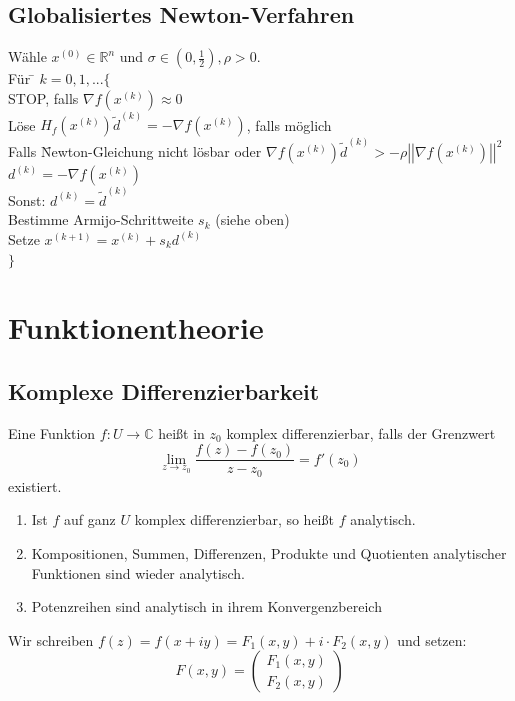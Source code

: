 \documentclass[4pt,a4paper]{scrartcl}
\begin{document}
\begin{multicols}{4}
\subsection{Globalisiertes Newton-Verfahren}
\begin{tabbing}
Wähle $x^{(0)}\in\mathbb{R}^n$ und $\sigma\in\left(0,\frac{1}{2}\right),\rho>0$.\\
Für \= $k=0,1,...\{$\\
\> STOP, falls $\nabla f\left(x^{(k)}\right)\approx 0$\\
\> Löse $H_f\left(x^{(k)}\right)\tilde{d}^{(k)}=-\nabla f\left(x^{(k)}\right)$, falls möglich\\
\>Falls \=Newton-Gleichung nicht lösbar oder $\nabla f\left(x^{(k)}\right)\tilde{d}^{(k)}>-\rho \left|\left|\nabla f\left(x^{(k)}\right)\right|\right|^2$\\
\>\> $d^{(k)}=-\nabla f\left(x^{(k)}\right)$\\
\>Sonst: $d^{(k)}=\tilde{d}^{(k)}$\\
\> Bestimme Armijo-Schrittweite $s_k$ (siehe oben)\\
\> Setze $x^{(k+1)}=x^(k)+s_kd^{(k)}$\\
$\}$
\end{tabbing}

\section{Funktionentheorie}

\subsection{Komplexe Differenzierbarkeit}
Eine Funktion $f:U\rightarrow\mathbb{C}$ heißt in $z_0$ komplex differenzierbar, falls der Grenzwert
\begin{equation*}
\lim\limits_{z\rightarrow z_0}\frac{f(z)-f(z_0)}{z-z_0}=f'(z_0)
\end{equation*}
existiert.
\begin{enumerate}[label=$\bullet$]
\item Ist $f$ auf ganz $U$ komplex differenzierbar, so heißt $f$ analytisch.
\item Kompositionen, Summen, Differenzen, Produkte und Quotienten analytischer Funktionen sind wieder analytisch.
\item Potenzreihen sind analytisch in ihrem Konvergenzbereich
\end{enumerate}
Wir schreiben $f(z)=f(x+iy)=F_1(x,y)+i\cdot F_2(x,y)$ und setzen:
\begin{equation*}
F(x,y)=\begin{pmatrix}F_1(x,y) \\ F_2(x,y)\end{pmatrix}
\end{equation*}


\end{multicols}
\end{document}

